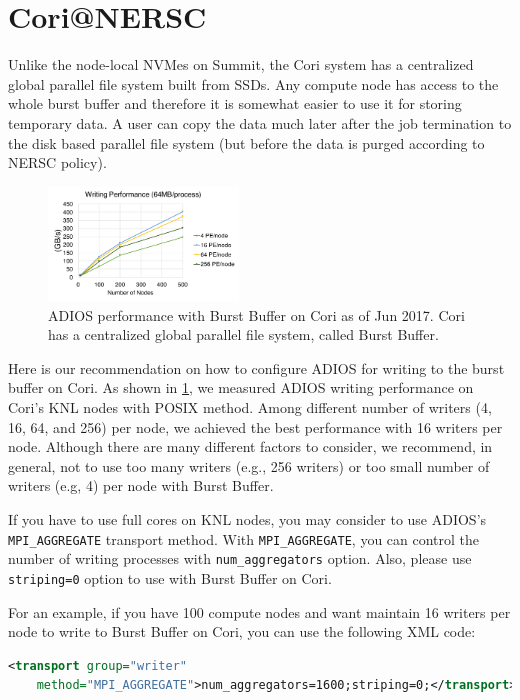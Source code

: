 \section{Cori@NERSC}

Unlike the node-local NVMes on Summit, the Cori system has a centralized global parallel file system built from SSDs. Any compute node has access to the whole burst buffer and therefore it is somewhat easier to use it for storing temporary data. A user can copy the data much later after the job termination to the disk based parallel file system (but before the data is purged according to NERSC policy).

\begin{figure}
\center
\includegraphics[width=0.45\textwidth]{figures/Adios_write_on_Cori.pdf}
\caption{ADIOS performance with Burst Buffer on Cori as of Jun 2017. Cori has a centralized global parallel file system, called Burst Buffer.}
\label{fig:cori}
\end{figure}

Here is our recommendation on how to configure ADIOS for writing to the burst buffer on Cori.
As shown in \ref{fig:cori}, we measured ADIOS writing performance on Cori's KNL nodes with POSIX method. Among different number of writers (4, 16, 64, and 256) per node, we achieved the best performance with 16 writers per node. Although there are many different factors to consider, we recommend, in general, not to use too many writers (e.g., 256 writers) or too small number of writers (e.g, 4) per node with Burst Buffer.

If you have to use full cores on KNL nodes, you may consider to use ADIOS's \verb+MPI_AGGREGATE+ transport method. With \verb+MPI_AGGREGATE+, you can control the number of writing processes with \verb+num_aggregators+ option. Also, please use \verb+striping=0+ option to use with Burst Buffer on Cori.

For an example, if you have 100 compute nodes and want maintain 16 writers per node to write to Burst Buffer on Cori, you can use the following XML code:
\begin{lstlisting}[language=XML]
<transport group="writer" 
	method="MPI_AGGREGATE">num_aggregators=1600;striping=0;</transport>
\end{lstlisting}



